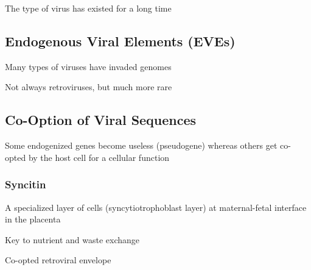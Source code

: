 \documentclass{notes}
\begin{document}
\tab The type of virus has existed for a long time

\subsection{Endogenous Viral Elements (EVEs)}

Many types of viruses have invaded genomes

\tab Not always retroviruses, but much more rare

\subsection{Co-Option of Viral Sequences}

Some endogenized genes become useless (pseudogene) whereas others get co-opted by the host cell for a cellular function

\subsubsection{Syncitin}

A specialized layer of cells (syncytiotrophoblast layer) at maternal-fetal interface in the placenta

\tab Key to nutrient and waste exchange

\tab Co-opted retroviral envelope

\end{document}
